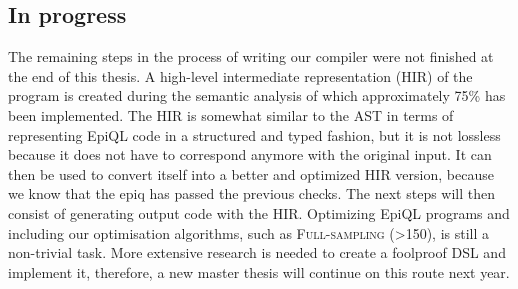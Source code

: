 \subsection{In progress}
The remaining steps in the process of writing our compiler were not finished at the end of this thesis. A high-level intermediate representation (HIR) of the program is created during the semantic analysis of which approximately 75\% has been implemented. The HIR is somewhat similar to the AST in terms of representing EpiQL code in a structured and typed fashion, but it is not lossless because it does not have to correspond anymore with the original input. It can then be used to convert itself into a better and optimized HIR version, because we know that the epiq has passed the previous checks. The next steps will then consist of generating output code with the HIR. Optimizing EpiQL programs and including our optimisation algorithms, such as \textsc{Full-sampling (>150)}, is still a non-trivial task. More extensive research is needed to create a foolproof DSL and implement it, therefore, a new master thesis will continue on this route next year.
